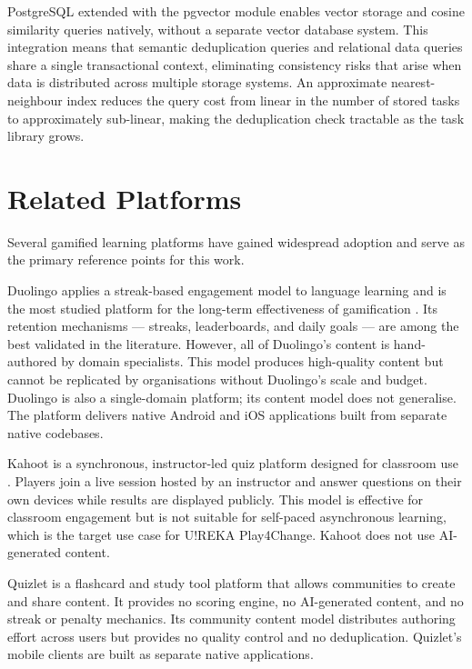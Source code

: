 PostgreSQL extended with the pgvector module enables vector storage and cosine similarity queries natively, without a separate vector database system. This integration means that semantic deduplication queries and relational data queries share a single transactional context, eliminating consistency risks that arise when data is distributed across multiple storage systems. An approximate nearest-neighbour index reduces the query cost from linear in the number of stored tasks to approximately sub-linear, making the deduplication check tractable as the task library grows.

\section{Related Platforms}
\label{sec:relatedplatforms}

Several gamified learning platforms have gained widespread adoption and serve as the primary reference points for this work.

Duolingo applies a streak-based engagement model to language learning and is the most studied platform for the long-term effectiveness of gamification \cite{hamari2014does}. Its retention mechanisms --- streaks, leaderboards, and daily goals --- are among the best validated in the literature. However, all of Duolingo's content is hand-authored by domain specialists. This model produces high-quality content but cannot be replicated by organisations without Duolingo's scale and budget. Duolingo is also a single-domain platform; its content model does not generalise. The platform delivers native Android and iOS applications built from separate native codebases.

Kahoot is a synchronous, instructor-led quiz platform designed for classroom use \cite{hamari2014does}. Players join a live session hosted by an instructor and answer questions on their own devices while results are displayed publicly. This model is effective for classroom engagement but is not suitable for self-paced asynchronous learning, which is the target use case for U!REKA Play4Change. Kahoot does not use AI-generated content.

Quizlet is a flashcard and study tool platform that allows communities to create and share content. It provides no scoring engine, no AI-generated content, and no streak or penalty mechanics. Its community content model distributes authoring effort across users but provides no quality control and no deduplication. Quizlet's mobile clients are built as separate native applications.

